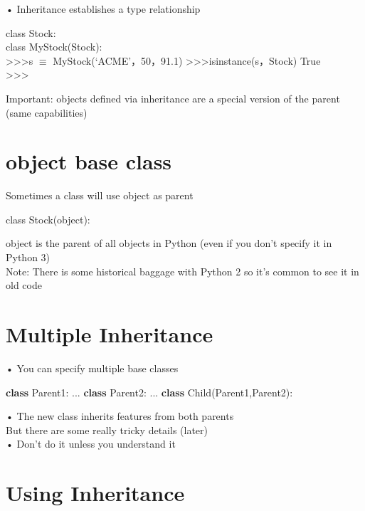 \documentclass[
  letterpaper,
  DIV=11,
  numbers=noendperiod]{scrreprt}
\newenvironment{Shaded}{\begin{snugshade}}{\end{snugshade}}
\newcommand{\KeywordTok}[1]{\textcolor[rgb]{0.00,0.23,0.31}{\textbf{#1}}}
\newcommand{\NormalTok}[1]{\textcolor[rgb]{0.00,0.23,0.31}{#1}}
\begin{document}
• Inheritance establishes a type relationship

class Stock:\\
class MyStock(Stock):\\
\textgreater\textgreater\textgreater s \(\equiv\)
MyStock(`ACME'，50，91.1)
\textgreater\textgreater\textgreater isinstance(s，Stock) True\\
\textgreater\textgreater\textgreater{}

Important: objects defined via inheritance are a special version of the
parent (same capabilities)


\chapter{object base class}\label{object-base-class}

Sometimes a class will use object as parent

class Stock(object):

object is the parent of all objects in Python (even if you don't specify
it in Python 3)\\
Note: There is some historical baggage with Python 2 so it's common to
see it in old code


\chapter{Multiple Inheritance}\label{multiple-inheritance}

• You can specify multiple base classes

\begin{Shaded}
\begin{Highlighting}[]
\KeywordTok{class}\NormalTok{ Parent1:   }
\NormalTok{...   }
\KeywordTok{class}\NormalTok{ Parent2:   }
\NormalTok{...   }
\KeywordTok{class}\NormalTok{ Child(Parent1,Parent2): }
\end{Highlighting}
\end{Shaded}

• The new class inherits features from both parents\\
But there are some really tricky details (later)\\
• Don't do it unless you understand it


\chapter{Using Inheritance}\label{using-inheritance}
\end{document}
